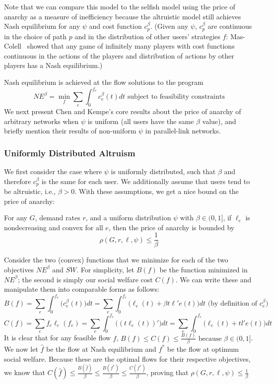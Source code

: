 Note that we can compare this model to the selfish model using the price of anarchy as a measure of inefficiency
because the altruistic model still achieves Nash equilibrium for any $\psi$ and cost function $c^\beta_p$. (Given any $\psi$, $c^\beta_p$ are continuous in the choice of path $p$ and in the distribution of other users' strategies $f$: Mas-Colell~\cite{mascolell} showed that any game of infinitely many players with cost functions continuous in the actions of the players and distribution of actions by other players has a Nash equilibrium.)

Nash equilibrium is achieved at the flow solutions to the program
$$NE^\beta = \min_f\sum_e\int_0^{f_e}c_e^\beta(t)dt \text{ subject to feasibility constraints}$$
We next present Chen and Kempe's core results about the price of anarchy of arbitrary networks when $\psi$ is uniform (all users have the same $\beta$ value), and briefly mention their results of non-uniform $\psi$ in parallel-link networks.

\subsubsection{Uniformly Distributed Altruism}
We first consider the case where $\psi$ is uniformly distributed, such that $\beta$ and therefore $c^\beta_p$ is the same for each user. We additionally assume that users tend to be altruistic, i.e., $\beta > 0$.
With these assumptions, we get a nice bound on the price of anarchy:
\begin{theorem}
For any $G$, demand rates $r$, and 
a uniform distribution $\psi$ with $\beta \in (0, 1]$,
if $\ell_e$ is nondecreasing and convex for all $e$, then the price of anarchy is bounded by 
    $$\rho(G,r,\ell,\psi) \le \frac{1}{\beta}$$
\end{theorem}

\begin{proof-sketch}
    Consider the two (convex) functions that we minimize for each of the two objectives $NE^\beta$ and $SW$. For simplicity, let $B(f)$ be the function minimized in $NE^\beta$; the second is simply our social welfare cost $C(f)$.
    We can write these and manipulate them into comparable forms as follows:
    $$B(f) = \sum_e\int_0^{{f}_e}\Big(c_e^\beta(t)\Big)dt = 
        \sum_e\int_0^{{f}_e} \Big(\ell_e(t) + \beta t\ell'e(t)\Big)dt\text{ (by definition of $c^\beta_e$)}$$
    $$C(f) = \sum_ef_e\ell_e(f_e) = \sum_e\int_0^{f_e} \Big((t\ell_e(t))' \Big)dt 
        = \sum_e\int_0^{f_e} \Big(\ell_e(t) + tl'e(t)\Big)dt$$ 
    It is clear that for any feasible flow $f$, 
    $B(f) \le C(f) \le \frac{B(f)}{\beta} \text{ because $\beta\in(0,1]$}$.
    We now let $\hat{f}$ be the flow at Nash equilibrium and $f^*$ be the flow at optimum social welfare. Because these are the optimal flows for their respective objectives, we know that 
    $C(\hat{f}) \le \frac{B(\hat{f})}{\beta} \le \frac{B(f^*)}{\beta} \le \frac{C(f^*)}{\beta}$,
    proving that 
    $\rho(G,r,\ell,\psi) \le \frac{1}{\beta}$
\end{proof-sketch}


